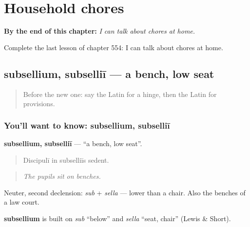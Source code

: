 
\chapter{Household chores}
\label{ch:la-household-chores}

\begin{chapteropening}
\textbf{By the end of this chapter:} \emph{I can talk about chores at home.}

Complete the last lesson of chapter 554: I can talk about chores at home.
\end{chapteropening}

\section[subsellium, subselliī]{subsellium, subselliī — a bench, low seat}

\label{lesson:LA-C554-subsellium}



\begin{quote}
Before the new one: say the Latin for a hinge, then the Latin for provisions.
\end{quote}

\subsection*{You'll want to know: subsellium, subselliī}
\textbf{subsellium, subselliī} — \textquotedblleft{}a bench, low seat\textquotedblright{}.

\begin{quote}
Discipulī in subselliīs sedent.
\end{quote}

\begin{quote}
\emph{The pupils sit on benches.}
\end{quote}

Neuter, second declension: \emph{sub} + \emph{sella} — lower than a chair. Also the benches of a law court.

\begin{cousinweb}
\textbf{subsellium} is built on \emph{sub} \textquotedblleft{}below\textquotedblright{} and \emph{sella} \textquotedblleft{}seat, chair\textquotedblright{} (Lewis \& Short).
\end{cousinweb}

